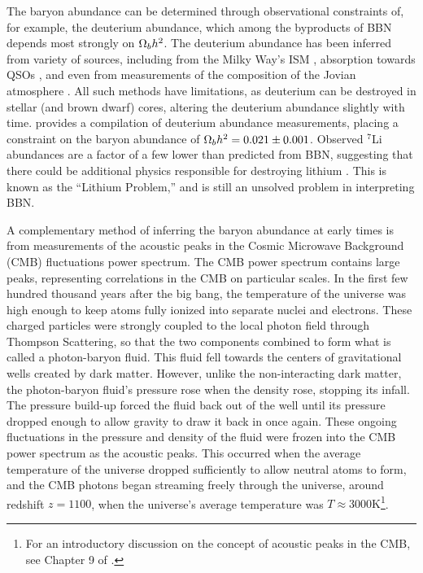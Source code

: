 

The baryon abundance can be determined through observational
constraints of, for example, the deuterium abundance, which among the
byproducts of BBN depends most strongly on $\Omega_b h^2$. The
deuterium abundance has been inferred from variety of sources,
including from the Milky Way's ISM \citep{Linsky1993, Linsky1995},
absorption towards QSOs \citep{Tytler1996, Kirkman2003}, and even from
measurements of the composition of the Jovian atmosphere
\citep{Niemann1996}. All such methods have limitations, as deuterium
can be destroyed in stellar (and brown dwarf) cores, altering the
deuterium abundance slightly with time. \citet{Iocco2009} provides a
compilation of deuterium abundance measurements, placing a
constraint on the baryon abundance of $\Omega_b h^2 = 0.021 \pm
0.001$. Observed $^7$Li abundances are a factor of a few lower than
predicted from BBN, suggesting that there could be additional physics
responsible for destroying lithium \citep{Suzuki2000,
  Melendez2004}. This is known as the ``Lithium Problem,'' and is
still an unsolved problem in interpreting BBN.

A complementary method of inferring the baryon abundance at early
times is from measurements of the acoustic peaks in the Cosmic
Microwave Background (CMB) fluctuations power spectrum. The CMB power
spectrum contains large peaks, representing correlations in the CMB on
particular scales. In the first few hundred thousand years after the
big bang, the temperature of the universe was high enough to keep
atoms fully ionized into separate nuclei and electrons. These charged
particles were strongly coupled to the local photon field through
Thompson Scattering, so that the two components combined to form what
is called a photon-baryon fluid. This fluid fell towards the centers
of gravitational wells created by dark matter. However, unlike the
non-interacting dark matter, the photon-baryon fluid's pressure rose
when the density rose, stopping its infall. The pressure build-up
forced the fluid back out of the well until its pressure dropped
enough to allow gravity to draw it back in once again. These ongoing
fluctuations in the pressure and density of the fluid were frozen into
the CMB power spectrum as the acoustic peaks. This occurred when the
average temperature of the universe dropped sufficiently to allow
neutral atoms to form, and the CMB photons began streaming freely
through the universe, around redshift $z=1100$, when the universe's
average temperature was $T\approx 3000\textrm{K}$\footnote{For an
  introductory discussion on the concept of acoustic peaks in the CMB,
  see Chapter 9 of \citet{Ryden2003}.}.

